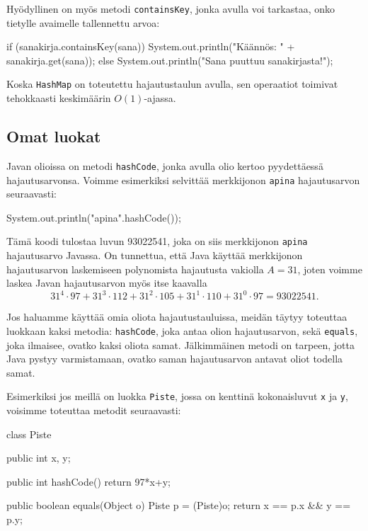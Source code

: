 Hyödyllinen on myös metodi \texttt{containsKey},
jonka avulla voi tarkastaa, onko tietylle avaimelle
tallennettu arvoa:

\begin{code}
if (sanakirja.containsKey(sana)) {
    System.out.println("Käännös: " + sanakirja.get(sana));
} else {
    System.out.println("Sana puuttuu sanakirjasta!");
}
\end{code}

Koska \texttt{HashMap} on toteutettu hajautustaulun avulla,
sen operaatiot toimivat tehokkaasti keskimäärin $O(1)$-ajassa.

\subsection{Omat luokat}

Javan olioissa on metodi \texttt{hashCode},
jonka avulla olio kertoo pyydettäessä hajautusarvonsa.
Voimme esimerkiksi selvittää merkkijonon \texttt{apina}
hajautusarvon seuraavasti:

\begin{code}
System.out.println("apina".hashCode());
\end{code}

Tämä koodi tulostaa luvun 93022541,
joka on siis merkkijonon \texttt{apina} hajautusarvo Javassa.
On tunnettua, että Java käyttää merkkijonon hajautusarvon laskemiseen
polynomista hajautusta vakiolla $A=31$,
joten voimme laskea Javan hajautusarvon myös itse kaavalla
\[31^4 \cdot 97+31^3 \cdot 112+31^2 \cdot 105+31^1 \cdot 110+31^0 \cdot 97=93022541.\]

Jos haluamme käyttää omia oliota hajautustauluissa,
meidän täytyy toteuttaa luokkaan kaksi metodia:
\texttt{hashCode}, joka antaa olion hajautusarvon,
sekä \texttt{equals},
joka ilmaisee, ovatko kaksi oliota samat.
Jälkimmäinen metodi on tarpeen,
jotta Java pystyy varmistamaan, ovatko saman hajautusarvon
antavat oliot todella samat.


Esimerkiksi jos meillä on luokka \texttt{Piste},
jossa on kenttinä kokonaisluvut \texttt{x} ja \texttt{y},
voisimme toteuttaa metodit seuraavasti:

\begin{code}
class Piste {
    public int x, y;

    public int hashCode() {
        return 97*x+y;
    }
    
    public boolean equals(Object o) {
        Piste p = (Piste)o;
        return x == p.x && y == p.y;
    }
}
\end{code}

